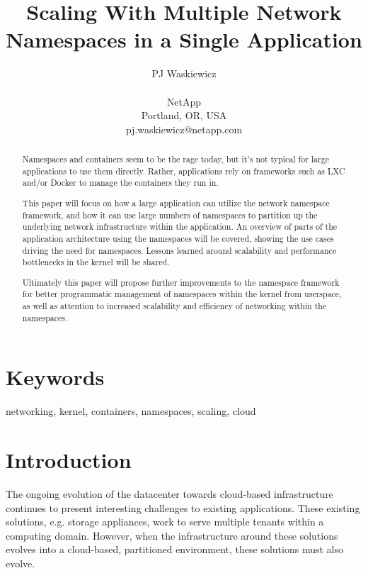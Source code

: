 \documentclass[letterpaper]{article}
\title{Scaling With Multiple Network Namespaces in a Single Application}
\author{PJ Waskiewicz\\
\\
NetApp\\
Portland, OR, USA\\
pj.waskiewicz@netapp.com\\
\newline
\newline
}
\begin{document}
 
\maketitle
\begin{abstract}
Namespaces and containers seem to be the rage today, but it’s not typical for large applications to use them directly. Rather, applications rely on frameworks such as LXC and/or Docker to manage the containers they run in.

This paper will focus on how a large application can utilize the network namespace framework, and how it can use large numbers of namespaces to partition up the underlying network infrastructure within the application. An overview of parts of the application architecture using the namespaces will be covered, showing the use cases driving the need for namespaces. Lessons learned around scalability and performance bottlenecks in the kernel will be shared.

Ultimately this paper will propose further improvements to the namespace framework for better programmatic management of namespaces within the kernel from userspace, as well as attention to increased scalability and efficiency of networking within the namespaces.
\end{abstract}

\section{Keywords}

networking, kernel, containers, namespaces, scaling, cloud

\section{Introduction}
The ongoing evolution of the datacenter towards cloud-based infrastructure continues to present interesting challenges to existing applications. These existing solutions, e.g. storage appliances, work to serve multiple tenants within a computing domain. However, when the infrastructure around these solutions evolves into a cloud-based, partitioned environment, these solutions must also evolve.
\end{document}
